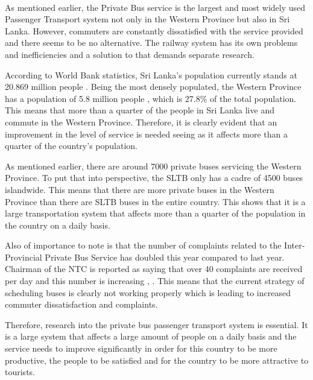 \documentclass[12pt, oneside]{report}
\begin{document}
\paragraph{} As mentioned earlier, the Private Bus service is the largest and most widely used Passenger Transport system not only in the Western Province but also in Sri Lanka. However, commuters are constantly dissatisfied with the service provided and there seems to be no alternative. The railway system has its own problems and inefficiencies and a solution to that demands separate research.

According to World Bank statistics, Sri Lanka’s population currently stands at 20.869 million people \citep{WorldBank2013}. Being the most densely populated, the Western Province has a population of 5.8 million people \citep{DepartmentofCensusandStatistics2012}, which is 27.8\% of the total population. This means that more than a quarter of the people in Sri Lanka live and commute in the Western Province. Therefore, it is clearly evident that an improvement in the level of service is needed seeing as it affects more than a quarter of the country’s population.

As mentioned earlier, there are around 7000 private buses servicing the Western Province. To put that into perspective, the SLTB only has a cadre of 4500 buses islandwide. This means that there are more private buses in the Western Province than there are SLTB buses in the entire country. This shows that it is a large transportation system that affects more than a quarter of the population in the country on a daily basis.

Also of importance to note is that the number of complaints related to the Inter-Provincial Private Bus Service has doubled this year compared to last year. Chairman of the NTC is reported as saying that over 40 complaints are received per day and this number is increasing \citep{Wickremasekara2012}, \citep{Range2012}. This means that the current strategy of scheduling buses is clearly not working properly which is leading to increased commuter dissatisfaction and complaints.

Therefore, research into the private bus passenger transport system is essential. It is a large system that affects a large amount of people on a daily basis and the service needs to improve significantly in order for this country to be more productive, the people to be satisfied and for the country to be more attractive to tourists.

\newpage
\end{document}
